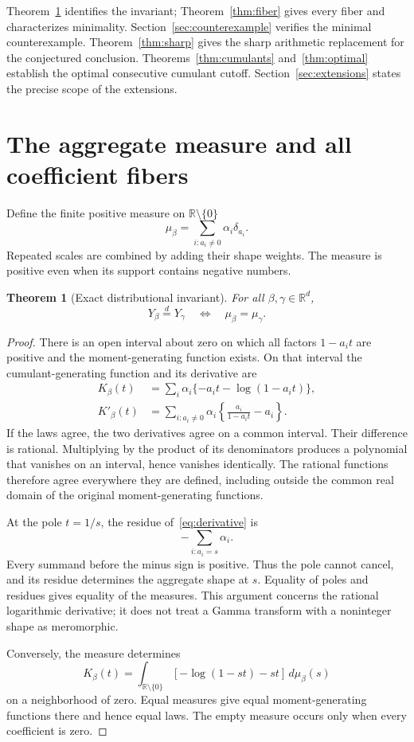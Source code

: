 \documentclass[11pt]{article}
\newtheorem{theorem}{Theorem}[section]
\theoremstyle{definition}\newtheorem{definition}[theorem]{Definition}
\theoremstyle{remark}\newtheorem{remark}[theorem]{Remark}
\newcommand{\R}{\mathbb R}
\newcommand{\eqd}{\overset{d}{=}}
\begin{document}
Theorem~\ref{thm:invariant} identifies the invariant; Theorem~\ref{thm:fiber} gives every fiber and characterizes minimality. Section~\ref{sec:counterexample} verifies the minimal counterexample. Theorem~\ref{thm:sharp} gives the sharp arithmetic replacement for the conjectured conclusion. Theorems~\ref{thm:cumulants} and~\ref{thm:optimal} establish the optimal consecutive cumulant cutoff. Section~\ref{sec:extensions} states the precise scope of the extensions.

\section{The aggregate measure and all coefficient fibers}
Define the finite positive measure on $\R\setminus\{0\}$
\begin{equation}\label{eq:measure}
 \mu_\beta=\sum_{i:a_i\ne0}\alpha_i\delta_{a_i}.
\end{equation}
Repeated scales are combined by adding their shape weights. The measure is positive even when its support contains negative numbers.

\begin{theorem}[Exact distributional invariant]\label{thm:invariant}
For all $\beta,\gamma\in\R^d$,
\[
 Y_\beta\eqd Y_\gamma\quad\Longleftrightarrow\quad \mu_\beta=\mu_\gamma.
\]
\end{theorem}
\begin{proof}
There is an open interval about zero on which all factors $1-a_it$ are positive and the moment-generating function exists. On that interval the cumulant-generating function and its derivative are
\begin{align}
 K_\beta(t)&=\sum_i\alpha_i\{-a_it-\log(1-a_it)\},\label{eq:cgf}\\
 K'_\beta(t)&=\sum_{i:a_i\ne0}\alpha_i
 \left\{\frac{a_i}{1-a_it}-a_i\right\}.\label{eq:derivative}
\end{align}
If the laws agree, the two derivatives agree on a common interval. Their difference is rational. Multiplying by the product of its denominators produces a polynomial that vanishes on an interval, hence vanishes identically. The rational functions therefore agree everywhere they are defined, including outside the common real domain of the original moment-generating functions.

At the pole $t=1/s$, the residue of~\eqref{eq:derivative} is
\[
 -\sum_{i:a_i=s}\alpha_i.
\]
Every summand before the minus sign is positive. Thus the pole cannot cancel, and its residue determines the aggregate shape at $s$. Equality of poles and residues gives equality of the measures. This argument concerns the rational logarithmic derivative; it does not treat a Gamma transform with a noninteger shape as meromorphic.

Conversely, the measure determines
\[
 K_\beta(t)=\int_{\R\setminus\{0\}}[-\log(1-st)-st]\,d\mu_\beta(s)
\]
on a neighborhood of zero. Equal measures give equal moment-generating functions there and hence equal laws. The empty measure occurs only when every coefficient is zero.
\end{proof}
\end{document}
